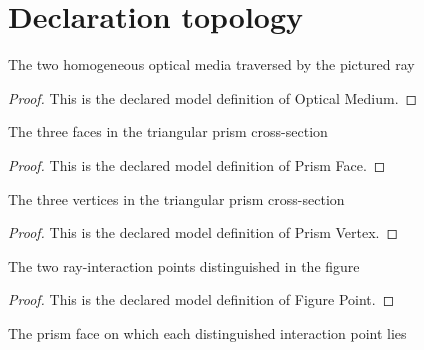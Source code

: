 \section{Declaration topology}
\begin{definition}
  \label{def:physics:phyx-mini-0097:phyxminiproblems-problemphyxmini0097-opticalmedium}
  The two homogeneous optical media traversed by the pictured ray
\end{definition}
\begin{proof}
  This is the declared model definition of Optical Medium.
\end{proof}
\begin{definition}
  \label{def:physics:phyx-mini-0097:phyxminiproblems-problemphyxmini0097-prismface}
  The three faces in the triangular prism cross-section
\end{definition}
\begin{proof}
  This is the declared model definition of Prism Face.
\end{proof}
\begin{definition}
  \label{def:physics:phyx-mini-0097:phyxminiproblems-problemphyxmini0097-prismvertex}
  The three vertices in the triangular prism cross-section
\end{definition}
\begin{proof}
  This is the declared model definition of Prism Vertex.
\end{proof}
\begin{definition}
  \label{def:physics:phyx-mini-0097:phyxminiproblems-problemphyxmini0097-figurepoint}
  The two ray-interaction points distinguished in the figure
\end{definition}
\begin{proof}
  This is the declared model definition of Figure Point.
\end{proof}
\begin{definition}[face]
  \label{def:physics:phyx-mini-0097:phyxminiproblems-problemphyxmini0097-figurepoint-face}
  The prism face on which each distinguished interaction point lies
\end{definition}
